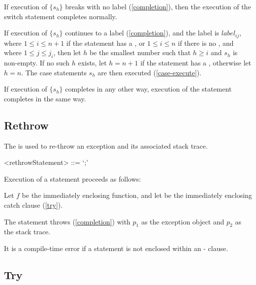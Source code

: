 \documentclass[makeidx]{article}
\begin{document}
{If execution of $\{s_h\}$ breaks with no label (\ref{completion}), then the execution of the switch statement completes normally.

If execution of $\{s_h\}$ continues to a label (\ref{completion}), and the label is $label_{ij}$, where $1 \le i \le n+1$ if the \SWITCH{} statement has a \DEFAULT{}, or $1 \le i \le n$ if there is no \DEFAULT{}, and where $1 \le j \le j_{i}$, then
let $h$ be the smallest number such that $h \ge i$ and $s_h$ is non-empty.
If no such $h$ exists, let $h = n + 1$ if the \SWITCH{} statement has a \DEFAULT{}, otherwise let $h = n$.
The case statements $s_h$ are then executed (\ref{case-execute}).

If execution of $\{s_h\}$ completes in any other way, execution of the \SWITCH{} statement completes in the same way.


\subsection{Rethrow}

\LMHash{}%
The  is used to re-throw an exception and its associated stack trace.

\begin{grammar}
<rethrowStatement> ::= \RETHROW{} `;'
\end{grammar}

\LMHash{}%
Execution of a \code{\RETHROW{}} statement proceeds as follows:

\LMHash{}%
Let $f$ be the immediately enclosing function, and let  be the immediately enclosing catch clause (\ref{try}).


\LMHash{}%
The \RETHROW{} statement throws (\ref{completion}) with $p_1$ as the exception object and $p_2$ as the stack trace.

\LMHash{}%
It is a compile-time error if a \code{\RETHROW{}} statement is not enclosed within an \ON-\CATCH{} clause.


\subsection{Try}

}
\end{document}
